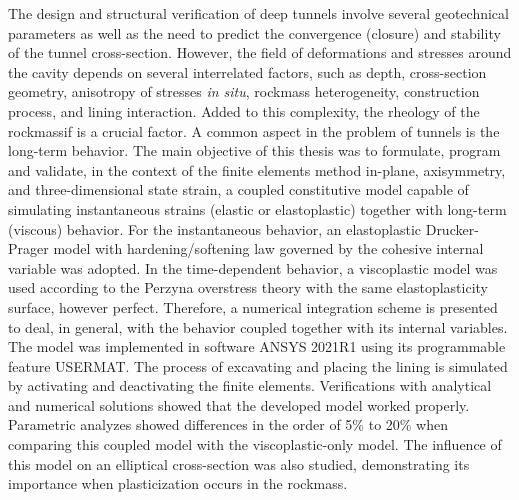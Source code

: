 The design and structural verification of deep tunnels involve several geotechnical parameters as well as the need to predict the convergence (closure) and stability of the tunnel cross-section. However, the field of deformations and stresses around the cavity depends on several interrelated factors, such as depth, cross-section geometry, anisotropy of stresses \textit{in situ}, rockmass heterogeneity, construction process, and lining interaction. Added to this complexity, the rheology of the rockmassif is a crucial factor. A common aspect in the problem of tunnels is the long-term behavior. The main objective of this thesis was to formulate, program and validate, in the context of the finite elements method in-plane, axisymmetry, and three-dimensional state strain, a coupled constitutive model capable of simulating instantaneous strains (elastic or elastoplastic) together with long-term (viscous) behavior. For the instantaneous behavior, an elastoplastic Drucker-Prager model with hardening/softening law governed by the cohesive internal variable was adopted. In the time-dependent behavior, a viscoplastic model was used according to the Perzyna overstress theory with the same elastoplasticity surface, however perfect. Therefore, a numerical integration scheme is presented to deal, in general, with the behavior coupled together with its internal variables. The model was implemented in software ANSYS 2021R1 using its programmable feature USERMAT. The process of excavating and placing the lining is simulated by activating and deactivating the finite elements. Verifications with analytical and numerical solutions showed that the developed model worked properly. Parametric analyzes showed differences in the order of 5\% to 20\% when comparing this coupled model with the viscoplastic-only model. The influence of this model on an elliptical cross-section was also studied, demonstrating its importance when plasticization occurs in the rockmass.